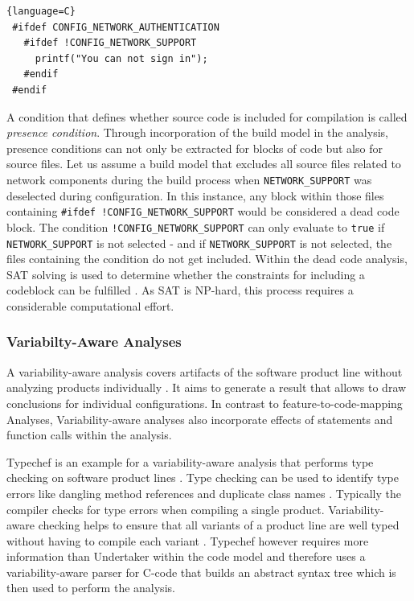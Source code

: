 \documentclass[a4paper]{article}
\begin{document}
\begin{lstlisting}[caption=Dead Code, label=dead-code]{language=C}
 #ifdef CONFIG_NETWORK_AUTHENTICATION
   #ifdef !CONFIG_NETWORK_SUPPORT
     printf("You can not sign in");
   #endif
 #endif
\end{lstlisting}

A condition that defines whether source code is included for compilation is called \emph{presence condition}. Through incorporation of the build model in the analysis, presence conditions can not only be extracted for blocks of code but also for source files. Let us assume a build model that excludes all source files related to network components during the build process when \texttt{NETWORK\_SUPPORT} was deselected during configuration. In this instance, any block within those files containing \texttt{\#ifdef !CONFIG\_NETWORK\_SUPPORT} would be considered a dead code block. The condition \texttt{!CONFIG\_NETWORK\_SUPPORT} can only evaluate to \texttt{true} if \texttt{NETWORK\_SUPPORT} is not selected - and if \texttt{NETWORK\_SUPPORT} is not selected, the files containing the condition do not get included. Within the dead code analysis, SAT solving is used to determine whether the constraints for including a codeblock can be fulfilled \cite{Tartler:2011:FCC:1966445.1966451}. As SAT is NP-hard, this process requires a considerable computational effort.

\subsubsection{Variabilty-Aware Analyses}

A variability-aware analysis covers artifacts of the software product line without analyzing products individually \cite[p.261]{Apel:2013:FSP:2541773}. It aims to generate a result that allows to draw conclusions for individual configurations. In contrast to feature-to-code-mapping Analyses, Variability-aware analyses also incorporate effects of statements and function calls within the analysis.

Typechef is an example for a variability-aware analysis that performs type checking on software product lines \cite{Dietrich:2012:RAV:2362536.2362544}. Type checking can be used to identify type errors like dangling method references and duplicate class names \cite{Thum:2014:CSA:2620784.2580950}. Typically the compiler checks for type errors when compiling a single product.  Variability-aware  checking helps to ensure that all variants of a product line are well typed without having to compile each variant \cite{Kenner:2010:TTT:1868688.1868693}. Typechef however requires more information than Undertaker within the code model and therefore uses a variability-aware parser for C-code that builds an abstract syntax tree which is then used to perform the analysis.
\end{document}
